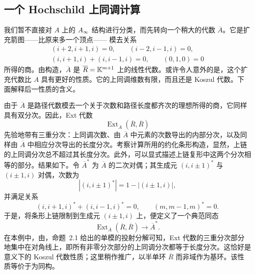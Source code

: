 \subsection{一个 Hochschild 上同调计算}\label{sec:20d}
我们暂不直接对 $A$ 上的 $A_\infty$ 结构进行分类，而先转向一个稍大的代数 $\overline A$。它是扩充箭图——比原来多一个顶点——
模去关系
\[
\begin{gathered}
(i+2,i+1,i)=0,\qquad(i-2,i-1,i)=0,\\
(i,i+1,i)+(i,i-1,i)=0,\qquad(0,1,0)=0
\end{gathered}
\]
所得的商。由构造，$\overline A$ 是 $\overline R=\mathbb K^{m+1}$ 上的线性代数。或许令人意外的是，这个扩充代数比 $A$ 具有更好的性质。它的上同调维数有限，而且还是 Koszul 代数。下面解释后一性质的含义。

由于 $\overline A$ 是路径代数模去一个关于次数和路径长度都齐次的理想所得的商，它同样具有双分次。因此，Ext 代数
\begin{equation}\label{eq:20.11}
\operatorname{Ext}_{\overline A}(\overline R,\overline R)
\end{equation}
先验地带有三重分次：上同调次数、由 $\overline A$ 中元素的次数导出的内部分次，以及同样由 $\overline A$ 中相应分次导出的长度分次。考察计算所用的约化条形构造，显然，上链的上同调分次总不超过其长度分次。此外，可以显式描述上链复形中这两个分次相等的部分。结果如下。令 $\overline A^*$ 为 $\overline A$ 的二次对偶；其生成元 $(i,i\pm1)^*$ 与 $(i\pm1,i)$ 对偶，次数为
\[
|(i,i\pm1)^*|=1-|(i\pm1,i)|,
\]
并满足关系
\[
(i,i+1,i)^*+(i,i-1,i)^*=0,\qquad(m,m-1,m)^*=0.
\]
于是，将条形上链限制到生成元 $(i\pm1,i)$ 上，便定义了一个典范同态
\begin{equation}\label{eq:20.12}
\operatorname{Ext}_{\overline A}(\overline R,\overline R)\longrightarrow\overline A^*.
\end{equation}
在本例中，由，命题~2.1 给出的单模的投射分解可知，Ext 代数的三重分次部分地集中在对角线上，即所有非零分次部分的上同调分次都等于长度分次。这恰好是意义下的 Koszul 代数性质；这里稍作推广，以半单环 $\overline R$ 而非域作为基环。该性质等价于为同构。

